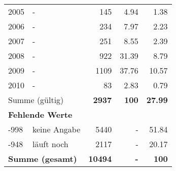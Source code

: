 \begin{longtable}{lXrrr}
     2005 &
     \multicolumn{1}{X}{ -  } &


       \num{145} &
       \num[round-mode=places,round-precision=2]{4,94} &
         \num[round-mode=places,round-precision=2]{1,38} \\

     2006 &
     \multicolumn{1}{X}{ -  } &


       \num{234} &
       \num[round-mode=places,round-precision=2]{7,97} &
         \num[round-mode=places,round-precision=2]{2,23} \\

     2007 &
     \multicolumn{1}{X}{ -  } &


       \num{251} &
       \num[round-mode=places,round-precision=2]{8,55} &
         \num[round-mode=places,round-precision=2]{2,39} \\

     2008 &
     \multicolumn{1}{X}{ -  } &


       \num{922} &
       \num[round-mode=places,round-precision=2]{31,39} &
         \num[round-mode=places,round-precision=2]{8,79} \\

     2009 &
     \multicolumn{1}{X}{ -  } &


       \num{1109} &
       \num[round-mode=places,round-precision=2]{37,76} &
         \num[round-mode=places,round-precision=2]{10,57} \\

     2010 &
     \multicolumn{1}{X}{ -  } &


       \num{83} &
       \num[round-mode=places,round-precision=2]{2,83} &
         \num[round-mode=places,round-precision=2]{0,79} \\
     \midrule
     \multicolumn{2}{l}{Summe (gültig)} &
       \textbf{\num{2937}} &
     \textbf{100} &
       \textbf{\num[round-mode=places,round-precision=2]{27,99}} \\
     \multicolumn{5}{l}{\textbf{Fehlende Werte}}\\
       -998 &
       keine Angabe &
         \num{5440} &
        - &
         \num[round-mode=places,round-precision=2]{51,84} \\
       -948 &
       läuft noch &
         \num{2117} &
        - &
         \num[round-mode=places,round-precision=2]{20,17} \\
     \midrule
     \multicolumn{2}{l}{\textbf{Summe (gesamt)}} &
          \textbf{\num{10494}} &
        \textbf{-} &
        \textbf{100} \\
     \bottomrule
     \end{longtable}
     
